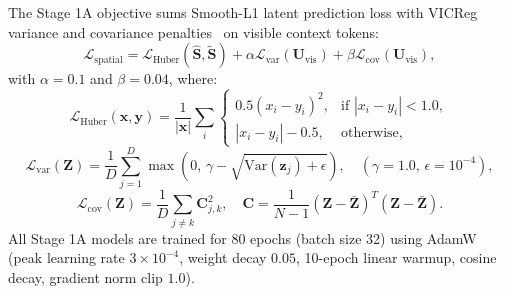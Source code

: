 \documentclass[runningheads]{llncs}
\begin{document}
The Stage 1A objective sums Smooth-L1 latent prediction loss with VICReg variance and covariance penalties~\cite{bardes2022vicreg} on visible context tokens:
\begin{equation}
\mathcal{L}_{\text{spatial}} = \mathcal{L}_{\text{Huber}}\left(\hat{\mathbf{S}}, \tilde{\mathbf{S}}\right) + \alpha \mathcal{L}_{\text{var}}\left(\mathbf{U}_{\text{vis}}\right) + \beta \mathcal{L}_{\text{cov}}\left(\mathbf{U}_{\text{vis}}\right),
\end{equation}
with $\alpha = 0.1$ and $\beta = 0.04$, where:
\begin{equation}
\mathcal{L}_{\text{Huber}}(\mathbf{x}, \mathbf{y}) = \frac{1}{|\mathbf{x}|} \sum_i \begin{cases}
0.5 (x_i - y_i)^2, & \text{if } |x_i - y_i| < 1.0, \\
|x_i - y_i| - 0.5, & \text{otherwise},
\end{cases}
\end{equation}
\begin{equation}
\mathcal{L}_{\text{var}}(\mathbf{Z}) = \frac{1}{D} \sum_{j=1}^D \max\left(0,\, \gamma - \sqrt{\mathrm{Var}(\mathbf{z}_j) + \epsilon}\right), \quad (\gamma = 1.0,\, \epsilon = 10^{-4}),
\end{equation}
\begin{equation}
\mathcal{L}_{\text{cov}}(\mathbf{Z}) = \frac{1}{D} \sum_{j \neq k} \mathbf{C}_{j,k}^2, \quad \mathbf{C} = \frac{1}{N - 1} \left(\mathbf{Z} - \bar{\mathbf{Z}}\right)^T \left(\mathbf{Z} - \bar{\mathbf{Z}}\right).
\end{equation}
All Stage 1A models are trained for 80 epochs (batch size 32) using AdamW~\cite{loshchilov2019adamw} (peak learning rate $3\times10^{-4}$, weight decay $0.05$, 10-epoch linear warmup, cosine decay, gradient norm clip $1.0$).
\end{document}
